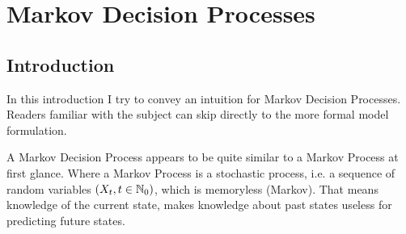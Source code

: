 
\chapter{Markov Decision Processes}
\section{Introduction}
In this introduction I try to convey an intuition for Markov Decision Processes. Readers familiar with the subject can skip directly to the more formal model formulation. 

A Markov Decision Process appears to be quite similar to a Markov Process at first glance. Where a Markov Process is a stochastic process, i.e. a sequence of random variables \((X_t,t\in\mathbb{N}_0)\), which is memoryless (Markov). That means knowledge of the current state, makes knowledge about past states useless for predicting future states.


